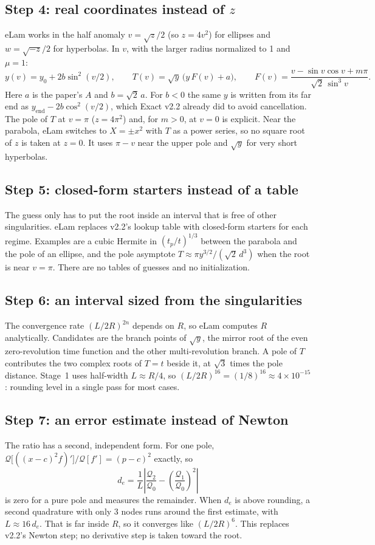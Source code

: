 \documentclass[11pt]{article}
\newcommand{\Q}{\mathcal{Q}}
\begin{document}
\subsection*{Step 4: real coordinates instead of $z$}
eLam works in the half anomaly $v = \sqrt{z}/2$ (so $z = 4v^2$) for ellipses and $w = \sqrt{-z}/2$ for hyperbolas. In $v$, with the larger radius normalized to 1 and $\mu=1$:
\begin{equation}
  y(v) = y_0 + 2b\sin^2(v/2), \qquad T(v) = \sqrt{y}\,\big(y\,F(v) + a\big), \qquad F(v) = \frac{v - \sin v\cos v + m\pi}{\sqrt2\,\sin^3 v}.
\end{equation}
Here $a$ is the paper's $A$ and $b = \sqrt2\,a$. For $b<0$ the same $y$ is written from its far end as $y_\text{end} - 2b\cos^2(v/2)$, which Exact v2.2 already did to avoid cancellation. The pole of $T$ at $v=\pi$ ($z=4\pi^2$) and, for $m>0$, at $v=0$ is explicit. Near the parabola, eLam switches to $X=\pm x^2$ with $T$ as a power series, so no square root of $z$ is taken at $z=0$. It uses $\pi-v$ near the upper pole and $\sqrt{y}$ for very short hyperbolas.

\subsection*{Step 5: closed-form starters instead of a table}
The guess only has to put the root inside an interval that is free of other singularities. eLam replaces v2.2's lookup table with closed-form starters for each regime. Examples are a cubic Hermite in $(t_p/t)^{1/3}$ between the parabola and the pole of an ellipse, and the pole asymptote $T \approx \pi y^{3/2}/(\sqrt2\,d^3)$ when the root is near $v=\pi$. There are no tables of guesses and no initialization.

\subsection*{Step 6: an interval sized from the singularities}
The convergence rate $(L/2R)^{2n}$ depends on $R$, so eLam computes $R$ analytically. Candidates are the branch points of $\sqrt{y}$, the mirror root of the even zero-revolution time function and the other multi-revolution branch. A pole of $T$ contributes the two complex roots of $T=t$ beside it, at $\sqrt3$ times the pole distance. Stage~1 uses half-width $L\approx R/4$, so $(L/2R)^{16} = (1/8)^{16} \approx 4\times10^{-15}$: rounding level in a single pass for most cases.

\subsection*{Step 7: an error estimate instead of Newton}
The ratio has a second, independent form. For one pole, $\Q\big[((x-c)^2f)'\big]/\Q[f'] = (p-c)^2$ exactly, so
\[
  d_e = \frac{1}{L}\left|\frac{\Q_2}{\Q_0} - \left(\frac{\Q_1}{\Q_0}\right)^2\right|
\]
is zero for a pure pole and measures the remainder. When $d_e$ is above rounding, a second quadrature with only 3 nodes runs around the first estimate, with $L \approx 16\,d_e$. That is far inside $R$, so it converges like $(L/2R)^6$. This replaces v2.2's Newton step; no derivative step is taken toward the root.
\end{document}
